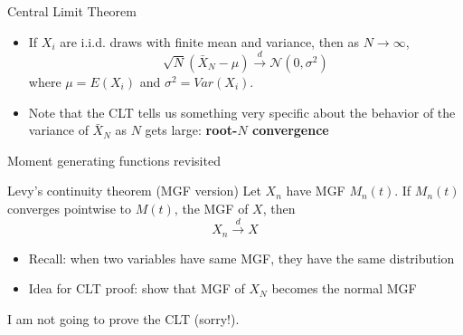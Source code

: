 


\begin{frame}{Central Limit Theorem}
\begin{itemize}
	\item If $X_i$ are i.i.d. draws with finite mean and variance, then as $N\rightarrow \infty$,
	\[
		\sqrt{N} \left( \bar{X}_N  - \mu\right) \overset{d}{\rightarrow} \mathcal{N}\left(0,\sigma^2\right) 
	\]
	where $\mu=E\left(X_i\right)$ and $\sigma^2 = Var\left(X_i\right)$.

	\medskip
	\item Note that the CLT tells us something very specific about the behavior of
			the variance of $\bar{X}_N$ as $N$ gets large: {\bf root-$N$ convergence}
\end{itemize}
\end{frame}




\begin{frame}{Moment generating functions revisited}
\begin{center}
\begin{minipage}{.8\textwidth}
	\begin{block}{Levy's continuity theorem (MGF version)}
	Let $X_n$ have MGF $M_n\left(t\right)$. If  $M_n\left(t\right)$ 
 	converges pointwise to $M\left(t\right)$, the MGF of $X$, then\[
	X_n \overset{d}{\rightarrow} X
	\]
	
	\end{block}
\end{minipage}

\begin{itemize}
	\item Recall: when two variables have same MGF, they have the same distribution
	\item Idea for CLT proof: show that MGF of $X_{N}$ becomes the normal MGF
\end{itemize}
\end{center}
I am not going to prove the CLT (sorry!).
\end{frame}



